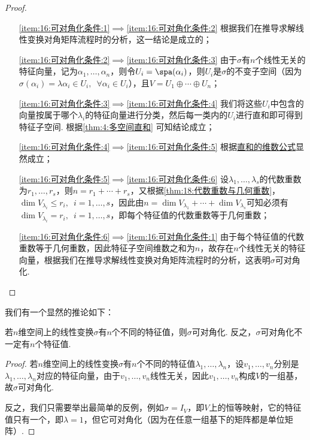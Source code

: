 \begin{proof}
    \begin{itemize}
        \item[\ref*{item:16:可对角化条件:1}$\implies$\ref*{item:16:可对角化条件:2}] 根据我们在推导求解线性变换对角矩阵流程时的分析，这一结论是成立的；

        \item[\ref*{item:16:可对角化条件:2}$\implies$\ref*{item:16:可对角化条件:3}] 由于$\sigma$有$n$个线性无关的特征向量，记为$\alpha_1,\ldots,\alpha_n$，则令$U_i=\spa(\alpha_i)$，则$U_i$是$\sigma$的不变子空间（因为$\sigma(\alpha_i)=\lambda\alpha_i\in U_i,\enspace\forall\alpha_i\in U_i$），且$V=U_1\oplus\cdots\oplus U_n$；

        \item[\ref*{item:16:可对角化条件:3}$\implies$\ref*{item:16:可对角化条件:4}] 我们将这些$U_i$中包含的向量按属于哪个$\lambda_i$的特征向量进行分类，然后每一类内的$U_i$进行直和即可得到特征子空间. 根据\autoref{thm:4:多空间直和} 可知结论成立；

        \item[\ref*{item:16:可对角化条件:4}$\implies$\ref*{item:16:可对角化条件:5}] 根据\hyperref[thm:4:直和等价命题]{直和的维数公式}显然成立；

        \item[\ref*{item:16:可对角化条件:5}$\implies$\ref*{item:16:可对角化条件:6}] 设$\lambda_1,\ldots,\lambda_s$的代数重数为$r_1,\ldots,r_s$，则$n=r_1+\cdots+r_s$，又根据\autoref{thm:18:代数重数与几何重数}，$\dim V_{\lambda_i}\leqslant r_i,\enspace i=1,\ldots,s$，因此由$n=\dim V_{\lambda_1}+\cdots+\dim V_{\lambda_s}$可知必须有$\dim V_{\lambda_i}=r_i,\enspace i=1,\ldots,s$，即每个特征值的代数重数等于几何重数；

        \item[\ref*{item:16:可对角化条件:6}$\implies$\ref*{item:16:可对角化条件:1}] 由于每个特征值的代数重数等于几何重数，因此特征子空间维数之和为$n$，故存在$n$个线性无关的特征向量，根据我们在推导求解线性变换对角矩阵流程时的分析，这表明$\sigma$可对角化.
    \end{itemize}
\end{proof}

我们有一个显然的推论如下：
\begin{corollary}\label{cor:19:可对角化必要条件}
    若$n$维空间上的线性变换$\sigma$有$n$个不同的特征值，则$\sigma$可对角化. 反之，$\sigma$可对角化不一定有$n$个特征值.
\end{corollary}

\begin{proof}
    若$n$维空间上的线性变换$\sigma$有$n$个不同的特征值$\lambda_1,\ldots,\lambda_n$，设$v_1,\ldots,v_n$分别是$\lambda_1,\ldots,\lambda_n$对应的特征向量，由于$v_1,\ldots,v_n$线性无关，因此$v_1,\ldots,v_n$构成$V$的一组基，故$\sigma$可对角化.

    反之，我们只需要举出最简单的反例，例如$\sigma=I_V$，即$V$上的恒等映射，它的特征值只有一个，即$\lambda=1$，但它可对角化（因为在任意一组基下的矩阵都是单位矩阵）.
\end{proof}

